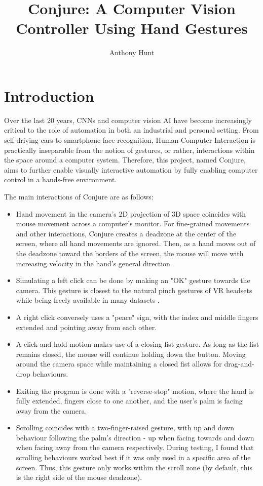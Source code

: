 \documentclass{article}
\title{Conjure: A Computer Vision Controller Using Hand Gestures}
\author{Anthony Hunt}
\begin{document}
\maketitle

\section{Introduction}
Over the last 20 years, CNNs and computer vision AI have become increasingly critical to the role of automation in both an industrial and personal setting. From self-driving cars to smartphone face recognition, Human-Computer Interaction is practically inseparable from the notion of gestures, or rather, interactions within the space around a computer system. Therefore, this project, named Conjure, aims to further enable visually interactive automation by fully enabling computer control in a hands-free environment.

The main interactions of Conjure are as follows:
\begin{itemize}
    \item Hand movement in the camera's 2D projection of 3D space coincides with mouse movement across a computer's monitor. For fine-grained movements and other interactions, Conjure creates a deadzone at the center of the screen, where all hand movements are ignored. Then, as a hand moves out of the deadzone toward the borders of the screen, the mouse will move with increasing velocity in the hand's general direction.
    \item Simulating a left click can be done by making an "OK" gesture towards the camera. This gesture is closest to the natural pinch gestures of VR headsets while being freely available in many datasets \cite{Alexander_2024, nuzhdin2024hagridv21mimagesstatic, zimmermann2017learningestimate3dhand, gesture_recognizer}.
    \item A right click conversely uses a "peace" sign, with the index and middle fingers extended and pointing away from each other.
    \item A click-and-hold motion makes use of a closing fist gesture. As long as the fist remains closed, the mouse will continue holding down the button. Moving around the camera space while maintaining a closed fist allows for drag-and-drop behaviours.
    \item Exiting the program is done with a "reverse-stop" motion, where the hand is fully extended, fingers close to one another, and the user's palm is facing away from the camera.
    \item Scrolling coincides with a two-finger-raised gesture, with up and down behaviour following the palm's direction - up when facing towards and down when facing away from the camera respectively. During testing, I found that scrolling behaviours worked best if it was only used in a specific area of the screen. Thus, this gesture only works within the scroll zone (by default, this is the right side of the mouse deadzone).
\end{itemize}
\end{document}
